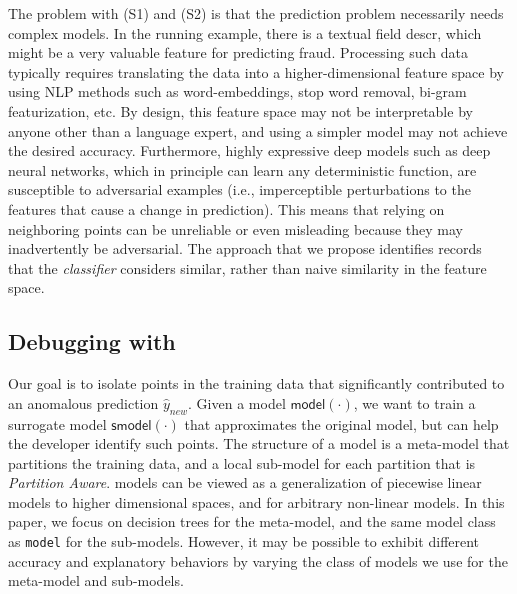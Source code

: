 The problem with (S1) and (S2) is that the prediction problem necessarily needs complex models. In the running example, there is a textual field \textsf{descr}, which might be a very valuable feature for predicting fraud. Processing such data typically requires translating the data into a higher-dimensional feature space by using NLP methods such as word-embeddings, stop word removal, bi-gram featurization, etc.  By design, this feature space may not be interpretable by anyone other than a language expert, and using a simpler model may not achieve the desired accuracy. Furthermore, highly expressive deep models such as deep neural networks, which in principle can learn any deterministic function, are susceptible to adversarial examples (i.e., imperceptible perturbations to the features that cause a change in prediction)\cite{szegedy2013intriguing}. This means that relying on neighboring points can be unreliable or even misleading because they may inadvertently be adversarial.  The approach that we propose identifies records that the {\it classifier} considers similar, rather than naive similarity in the feature space.

\subsection{Debugging with \sys}
Our goal is to isolate points in the training data that significantly contributed to an anomalous prediction $\hat{y}_{new}$.
Given a model $\textsf{model}(\cdot)$, we want to train a surrogate \sys model $\textsf{smodel}(\cdot)$ that approximates the original model, but can help the developer identify such points.
The structure of a \sys model is a meta-model that partitions the training data, and a local sub-model for each partition that is {\it Partition Aware}.
\sys models can be viewed as a generalization of piecewise linear models to higher dimensional spaces, and for arbitrary non-linear models.     
In this paper, we focus on decision trees for the meta-model, and the same model class as \texttt{model} for the sub-models. However, it may be possible to exhibit different accuracy and explanatory behaviors by varying the class of models we use for the meta-model and sub-models.

